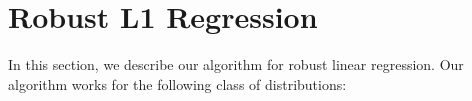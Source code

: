 \section{Robust L1 Regression}
In this section, we describe our algorithm for robust linear regression. Our algorithm works for the following class of distributions: 









